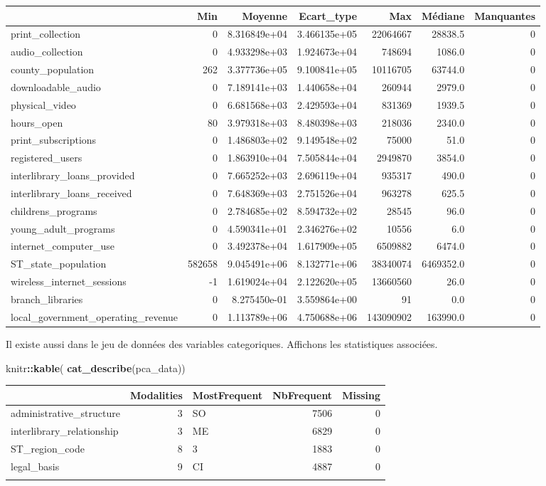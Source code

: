 \documentclass[14pt,]{article}
\newenvironment{Shaded}{\begin{snugshade}}{\end{snugshade}}
\newcommand{\KeywordTok}[1]{\textcolor[rgb]{0.13,0.29,0.53}{\textbf{#1}}}
\newcommand{\NormalTok}[1]{#1}
\newcommand{\OperatorTok}[1]{\textcolor[rgb]{0.81,0.36,0.00}{\textbf{#1}}}
\begin{document}
\begin{longtable}[]{@{}lrrrrrr@{}}
\toprule
& Min & Moyenne & Ecart\_type & Max & Médiane &
Manquantes\tabularnewline
\midrule
\endhead
print\_collection & 0 & 8.316849e+04 & 3.466135e+05 & 22064667 & 28838.5
& 0\tabularnewline
audio\_collection & 0 & 4.933298e+03 & 1.924673e+04 & 748694 & 1086.0 &
0\tabularnewline
county\_population & 262 & 3.377736e+05 & 9.100841e+05 & 10116705 &
63744.0 & 0\tabularnewline
downloadable\_audio & 0 & 7.189141e+03 & 1.440658e+04 & 260944 & 2979.0
& 0\tabularnewline
physical\_video & 0 & 6.681568e+03 & 2.429593e+04 & 831369 & 1939.5 &
0\tabularnewline
hours\_open & 80 & 3.979318e+03 & 8.480398e+03 & 218036 & 2340.0 &
0\tabularnewline
print\_subscriptions & 0 & 1.486803e+02 & 9.149548e+02 & 75000 & 51.0 &
0\tabularnewline
registered\_users & 0 & 1.863910e+04 & 7.505844e+04 & 2949870 & 3854.0 &
0\tabularnewline
interlibrary\_loans\_provided & 0 & 7.665252e+03 & 2.696119e+04 & 935317
& 490.0 & 0\tabularnewline
interlibrary\_loans\_received & 0 & 7.648369e+03 & 2.751526e+04 & 963278
& 625.5 & 0\tabularnewline
childrens\_programs & 0 & 2.784685e+02 & 8.594732e+02 & 28545 & 96.0 &
0\tabularnewline
young\_adult\_programs & 0 & 4.590341e+01 & 2.346276e+02 & 10556 & 6.0 &
0\tabularnewline
internet\_computer\_use & 0 & 3.492378e+04 & 1.617909e+05 & 6509882 &
6474.0 & 0\tabularnewline
ST\_state\_population & 582658 & 9.045491e+06 & 8.132771e+06 & 38340074
& 6469352.0 & 0\tabularnewline
wireless\_internet\_sessions & -1 & 1.619024e+04 & 2.122620e+05 &
13660560 & 26.0 & 0\tabularnewline
branch\_libraries & 0 & 8.275450e-01 & 3.559864e+00 & 91 & 0.0 &
0\tabularnewline
local\_government\_operating\_revenue & 0 & 1.113789e+06 & 4.750688e+06
& 143090902 & 163990.0 & 0\tabularnewline
\bottomrule
\end{longtable}

Il existe aussi dans le jeu de données des variables categoriques.
Affichons les statistiques associées.

\begin{Shaded}
\begin{Highlighting}[]
\NormalTok{knitr}\OperatorTok{::}\KeywordTok{kable}\NormalTok{(}
  \KeywordTok{cat_describe}\NormalTok{(pca_data))}
\end{Highlighting}
\end{Shaded}

\begin{longtable}[]{@{}lrlrr@{}}
\toprule
& Modalities & MostFrequent & NbFrequent & Missing\tabularnewline
\midrule
\endhead
administrative\_structure & 3 & SO & 7506 & 0\tabularnewline
interlibrary\_relationship & 3 & ME & 6829 & 0\tabularnewline
ST\_region\_code & 8 & 3 & 1883 & 0\tabularnewline
legal\_basis & 9 & CI & 4887 & 0\tabularnewline
\pagebreak & & & &\tabularnewline
\bottomrule
\end{longtable}
\end{document}
